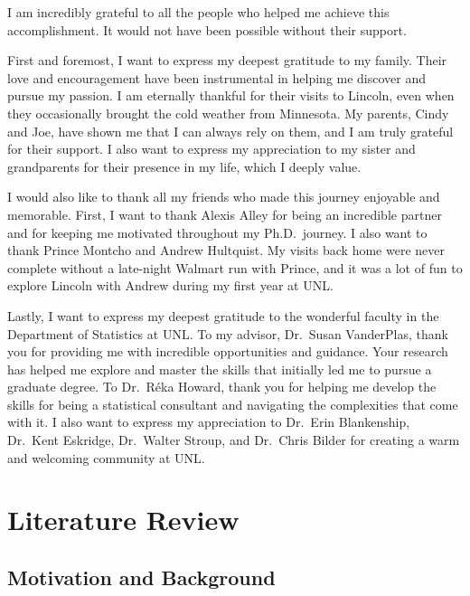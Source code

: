 \documentclass[phd]{nuthesis}
\begin{document}
\begin{acknowledgments}
I am incredibly grateful to all the people who helped me achieve this
accomplishment. It would not have been possible without their support.

First and foremost, I want to express my deepest gratitude to my family.
Their love and encouragement have been instrumental in helping me
discover and pursue my passion. I am eternally thankful for their visits
to Lincoln, even when they occasionally brought the cold weather from
Minnesota. My parents, Cindy and Joe, have shown me that I can always
rely on them, and I am truly grateful for their support. I also want to
express my appreciation to my sister and grandparents for their presence
in my life, which I deeply value.

I would also like to thank all my friends who made this journey
enjoyable and memorable. First, I want to thank Alexis Alley for being
an incredible partner and for keeping me motivated throughout my
Ph.D.~journey. I also want to thank Prince Montcho and Andrew Hultquist.
My visits back home were never complete without a late-night Walmart run
with Prince, and it was a lot of fun to explore Lincoln with Andrew
during my first year at UNL.

Lastly, I want to express my deepest gratitude to the wonderful faculty
in the Department of Statistics at UNL. To my advisor, Dr.~Susan
VanderPlas, thank you for providing me with incredible opportunities and
guidance. Your research has helped me explore and master the skills that
initially led me to pursue a graduate degree. To Dr.~Réka Howard, thank
you for helping me develop the skills for being a statistical consultant
and navigating the complexities that come with it. I also want to
express my appreciation to Dr.~Erin Blankenship, Dr.~Kent Eskridge,
Dr.~Walter Stroup, and Dr.~Chris Bilder for creating a warm and
welcoming community at UNL.
\end{acknowledgments}

\setcounter{tocdepth}{1}
\tableofcontents
\listoffigures
\listoftables

\mainmatter


\chapter{Literature Review}\label{literature-review}

\section{Motivation and Background}\label{motivation-and-background}
\end{document}
